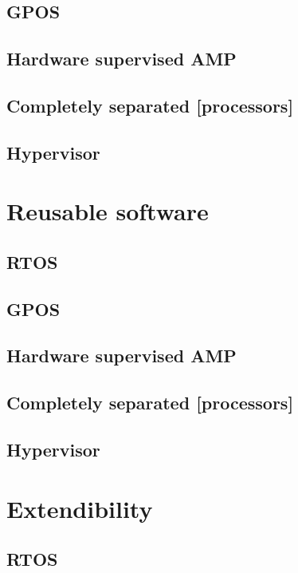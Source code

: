 \subsection{GPOS}
\subsection{Hardware supervised AMP}
\subsection{Completely separated [processors]}
\subsection{Hypervisor}


\section{Reusable software}
\subsection{RTOS}
\subsection{GPOS}
\subsection{Hardware supervised AMP}
\subsection{Completely separated [processors]}
\subsection{Hypervisor}


\section{Extendibility}
\subsection{RTOS}
